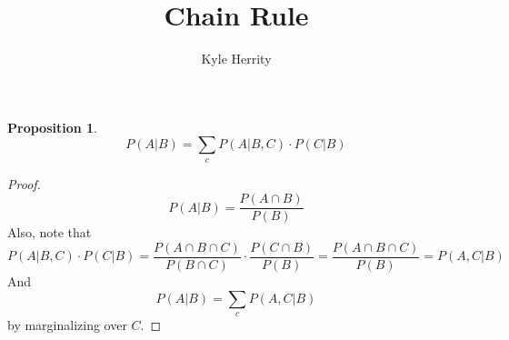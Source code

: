 \documentclass[11pt]{article}
\theoremstyle{plain}
\newtheorem{proposition}{Proposition}
\theoremstyle{definition}
\begin{document}
 
\title{Chain Rule}
\author{Kyle Herrity}
\maketitle

\begin{proposition}
 \[ P(A|B) = \sum_{c}P(A|B,C)\cdot P(C|B) \]
\end{proposition}
\begin{proof}
\[ P(A|B) = \frac{P(A \cap B)}{P(B)}\] 
Also, note that
\[ P(A | B, C) \cdot P(C|B) = \frac{P(A \cap B \cap C)}{P(B \cap C)} \cdot \frac{P(C \cap B)}{P(B)} =
\frac{P(A \cap B \cap C)}{P(B)} = P(A,C|B)\]
And 
\[P(A|B) = \sum_{c}P(A,C|B)\] by marginalizing over $C$.
\end{proof}
 
\end{document}
